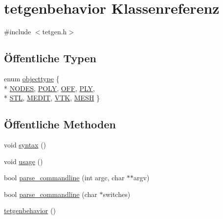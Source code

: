 \hypertarget{classtetgenbehavior}{\section{tetgenbehavior Klassenreferenz}
\label{classtetgenbehavior}
}


{\ttfamily \#include $<$tetgen.\-h$>$}

\subsection*{Öffentliche Typen}
\begin{DoxyCompactItemize}
\item 
enum \hyperlink{classtetgenbehavior_aeea08e7334fde4251b74a8247bcc54b8}{objecttype} \{ \\*
\hyperlink{classtetgenbehavior_aeea08e7334fde4251b74a8247bcc54b8a0dea21ab467c34ea234e50fad62ab476}{N\-O\-D\-E\-S}, 
\hyperlink{classtetgenbehavior_aeea08e7334fde4251b74a8247bcc54b8a29f2ee4cb708a9575042633e91d31053}{P\-O\-L\-Y}, 
\hyperlink{classtetgenbehavior_aeea08e7334fde4251b74a8247bcc54b8ac89624c6ccf5322957838b09dd8bc234}{O\-F\-F}, 
\hyperlink{classtetgenbehavior_aeea08e7334fde4251b74a8247bcc54b8afefe2d8d24bdcc0165c20ac6427570b2}{P\-L\-Y}, 
\\*
\hyperlink{classtetgenbehavior_aeea08e7334fde4251b74a8247bcc54b8a730e79948156f1850aa12bd6884d0c2e}{S\-T\-L}, 
\hyperlink{classtetgenbehavior_aeea08e7334fde4251b74a8247bcc54b8a00e5944100c4edb8136b9a7a08956fec}{M\-E\-D\-I\-T}, 
\hyperlink{classtetgenbehavior_aeea08e7334fde4251b74a8247bcc54b8a20dc5e713ee0d2cb7564ad72a9bcdd59}{V\-T\-K}, 
\hyperlink{classtetgenbehavior_aeea08e7334fde4251b74a8247bcc54b8a7643bd97f77bf992963f18bfa2fdc54d}{M\-E\-S\-H}
 \}
\end{DoxyCompactItemize}
\subsection*{Öffentliche Methoden}
\begin{DoxyCompactItemize}
\item 
void \hyperlink{classtetgenbehavior_a6e22cb6ec468a3b0a5fc45fcb4d9709c}{syntax} ()
\item 
void \hyperlink{classtetgenbehavior_aa0bf59fe9ca35269d58e5f1ee10aca05}{usage} ()
\item 
bool \hyperlink{classtetgenbehavior_a240b6eb4bee021fc945ca8b01f7b7b9f}{parse\-\_\-commandline} (int argc, char $\ast$$\ast$argv)
\item 
bool \hyperlink{classtetgenbehavior_abf5ad80b5b6900296253c6126f667fe2}{parse\-\_\-commandline} (char $\ast$switches)
\item 
\hyperlink{classtetgenbehavior_aa9c947b94b6b238e3aeedd7eb029667e}{tetgenbehavior} ()
\end{DoxyCompactItemize}
